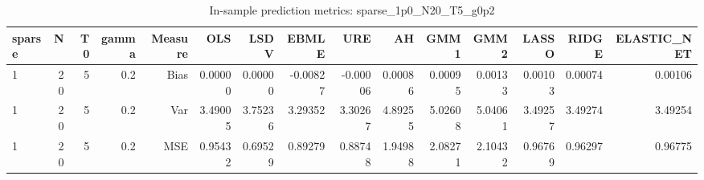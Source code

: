 \begin{table}[!htbp]\centering
\caption{In-sample prediction metrics: sparse_1p0_N20_T5_g0p2}
\label{tab:table2_sparse_1p0_N20_T5_g0p2}
\begin{tabular}{lrrrrrrrrrrrrrr}
\hline
sparse & N & T0 & gamma & Measure & OLS & LSDV & EBMLE & URE & AH & GMM1 & GMM2 & LASSO & RIDGE & ELASTIC_NET \\
\hline
1 & 20 & 5 & 0.2 & Bias & 0.00000 & 0.00000 & -0.00827 & -0.00006 & 0.00086 & 0.00095 & 0.00133 & 0.00103 & 0.00074 & 0.00106 \\
1 & 20 & 5 & 0.2 & Var & 3.49005 & 3.75236 & 3.29352 & 3.30267 & 4.89255 & 5.02608 & 5.04061 & 3.49257 & 3.49274 & 3.49254 \\
1 & 20 & 5 & 0.2 & MSE & 0.95432 & 0.69529 & 0.89279 & 0.88748 & 1.94988 & 2.08271 & 2.10432 & 0.96769 & 0.96297 & 0.96775 \\
\hline
\end{tabular}
\end{table}

